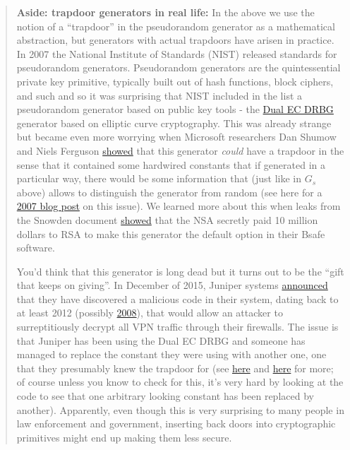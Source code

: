 
\begin{quote}
\textbf{Aside: trapdoor generators in real life:} In the above we use
the notion of a ``trapdoor'' in the pseudorandom generator as a
mathematical abstraction, but generators with actual trapdoors have
arisen in practice. In 2007 the National Institute of Standards (NIST)
released standards for pseudorandom generators. Pseudorandom generators
are the quintessential private key primitive, typically built out of
hash functions, block ciphers, and such and so it was surprising that
NIST included in the list a pseudorandom generator based on public key
tools - the \href{https://en.wikipedia.org/wiki/Dual_EC_DRBG}{Dual EC
DRBG} generator based on elliptic curve cryptography. This was already
strange but became even more worrying when Microsoft researchers Dan
Shumow and Niels Ferguson
\href{http://rump2007.cr.yp.to/15-shumow.pdf}{showed} that this
generator \emph{could} have a trapdoor in the sense that it contained
some hardwired constants that if generated in a particular way, there
would be some information that (just like in \(G_s\) above) allows to
distinguish the generator from random (see here for a
\href{https://www.schneier.com/blog/archives/2007/11/the_strange_sto.html}{2007
blog post} on this issue). We learned more about this when leaks from
the Snowden document
\href{http://www.reuters.com/article/us-usa-security-rsa-idUSBRE9BJ1C220131220}{showed}
that the NSA secretly paid 10 million dollars to RSA to make this
generator the default option in their Bsafe software.

You'd think that this generator is long dead but it turns out to be the
``gift that keeps on giving''. In December of 2015, Juniper systems
\href{http://www.wired.com/2015/12/juniper-networks-hidden-backdoors-show-the-risk-of-government-backdoors/}{announced}
that they have discovered a malicious code in their system, dating back
to at least 2012 (possibly \href{https://goo.gl/X6pAXV}{2008}), that
would allow an attacker to surreptitiously decrypt all VPN traffic
through their firewalls. The issue is that Juniper has been using the
Dual EC DRBG and someone has managed to replace the constant they were
using with another one, one that they presumably knew the trapdoor for
(see
\href{https://rpw.sh/blog/2015/12/21/the-backdoored-backdoor/}{here} and
\href{http://blog.cryptographyengineering.com/2015/12/on-juniper-backdoor.html}{here}
for more; of course unless you know to check for this, it's very hard by
looking at the code to see that one arbitrary looking constant has been
replaced by another). Apparently, even though this is very surprising to
many people in law enforcement and government, inserting back doors into
cryptographic primitives might end up making them less secure.
\end{quote}

